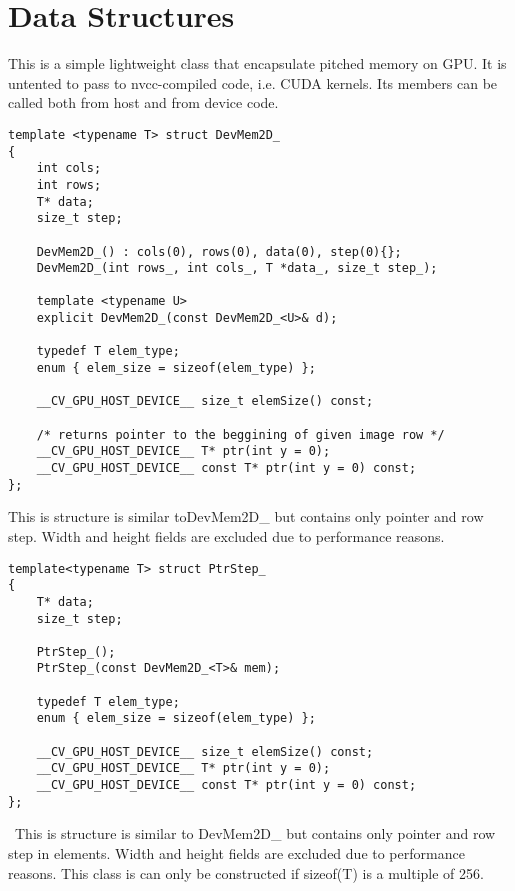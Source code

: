 \section{Data Structures}


\label{cppfunc.gpu.DevMem2D}

This is a simple lightweight class that encapsulate pitched memory on GPU. It is untented to pass to nvcc-compiled code, i.e. CUDA kernels. Its members can be called both from host and from device code.

\begin{lstlisting}
template <typename T> struct DevMem2D_
{            
    int cols;
    int rows;
    T* data;
    size_t step;
	
    DevMem2D_() : cols(0), rows(0), data(0), step(0){};	
    DevMem2D_(int rows_, int cols_, T *data_, size_t step_);
			
    template <typename U>            
    explicit DevMem2D_(const DevMem2D_<U>& d);
	
    typedef T elem_type;
    enum { elem_size = sizeof(elem_type) };

    __CV_GPU_HOST_DEVICE__ size_t elemSize() const;

    /* returns pointer to the beggining of given image row */
    __CV_GPU_HOST_DEVICE__ T* ptr(int y = 0);
    __CV_GPU_HOST_DEVICE__ const T* ptr(int y = 0) const;
};
\end{lstlisting}


\label{cppfunc.gpu.PtrStep}

This is structure is similar toDevMem2D\_ but contains only pointer and row step.  Width and height fields are excluded due to performance reasons.

\begin{lstlisting}
template<typename T> struct PtrStep_
{
	T* data;
	size_t step;

	PtrStep_();
	PtrStep_(const DevMem2D_<T>& mem);

	typedef T elem_type;
	enum { elem_size = sizeof(elem_type) };

	__CV_GPU_HOST_DEVICE__ size_t elemSize() const;
	__CV_GPU_HOST_DEVICE__ T* ptr(int y = 0);
	__CV_GPU_HOST_DEVICE__ const T* ptr(int y = 0) const;
};

\end{lstlisting}

\
This is structure is similar to DevMem2D\_ but contains only pointer and row step in elements. Width and height fields are excluded due to performance reasons. This class is can only be constructed if sizeof(T) is a multiple of 256.

